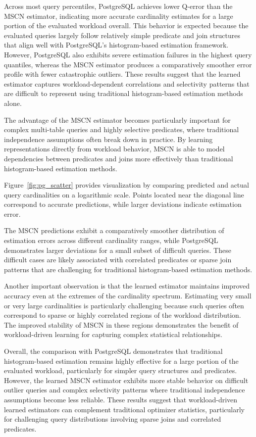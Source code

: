 Across most query percentiles, PostgreSQL achieves lower Q-error than the MSCN estimator, indicating more accurate cardinality estimates for a large portion of the evaluated workload overall. This behavior is expected because the evaluated queries largely follow relatively simple predicate and join structures that align well with PostgreSQL’s histogram-based estimation framework. However, PostgreSQL also exhibits severe estimation failures in the highest query quantiles, whereas the MSCN estimator produces a comparatively smoother error profile with fewer catastrophic outliers. These results suggest that the learned estimator captures workload-dependent correlations and selectivity patterns that are difficult to represent using traditional histogram-based estimation methods alone.

The advantage of the MSCN estimator becomes particularly important for complex multi-table queries and highly selective predicates, where traditional independence assumptions often break down in practice. By learning representations directly from workload behavior, MSCN is able to model dependencies between predicates and joins more effectively than traditional histogram-based estimation methods.

Figure~\ref{fig:pg_scatter} provides visualization by comparing predicted and actual query cardinalities on a logarithmic scale. Points located near the diagonal line correspond to accurate predictions, while larger deviations indicate estimation error.

The MSCN predictions exhibit a comparatively smoother distribution of estimation errors across different cardinality ranges, while PostgreSQL demonstrates larger deviations for a small subset of difficult queries. These difficult cases are likely associated with correlated predicates or sparse join patterns that are challenging for traditional histogram-based estimation methods.

Another important observation is that the learned estimator maintains improved accuracy even at the extremes of the cardinality spectrum. Estimating very small or very large cardinalities is particularly challenging because such queries often correspond to sparse or highly correlated regions of the workload distribution. The improved stability of MSCN in these regions demonstrates the benefit of workload-driven learning for capturing complex statistical relationships.

Overall, the comparison with PostgreSQL demonstrates that traditional histogram-based estimation remains highly effective for a large portion of the evaluated workload, particularly for simpler query structures and predicates. However, the learned MSCN estimator exhibits more stable behavior on difficult outlier queries and complex selectivity patterns where traditional independence assumptions become less reliable. These results suggest that workload-driven learned estimators can complement traditional optimizer statistics, particularly for challenging query distributions involving sparse joins and correlated predicates.

